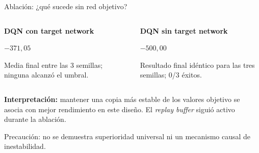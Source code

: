 \documentclass[aspectratio=169,10pt]{beamer}
\begin{document}
\begin{frame}{Ablación: ¿qué sucede sin red objetivo?}
\begin{columns}[T,onlytextwidth]
\begin{info}
\textbf{DQN con target network}\par\vspace{.13cm}
{\centering\color{Blue}\fontsize{27}{30}\selectfont\bfseries $-371,05$\par}
\vspace{.06cm}
\small Media final entre las 3 semillas; ninguna alcanzó el umbral.
\end{info}
\begin{info}
\textbf{DQN sin target network}\par\vspace{.13cm}
{\centering\color{Warn}\fontsize{27}{30}\selectfont\bfseries $-500,00$\par}
\vspace{.06cm}
\small Resultado final idéntico para las tres semillas; 0/3 éxitos.
\end{info}
\end{columns}
\vspace{.15cm}
\begin{takeaway}
\textbf{Interpretación:} mantener una copia más estable de los valores objetivo se asocia con mejor rendimiento en este diseño. El \emph{replay buffer} siguió activo durante la ablación.
\end{takeaway}
\vspace{.09cm}
{\footnotesize\color{Muted} Precaución: no se demuestra superioridad universal ni un mecanismo causal de inestabilidad.}
\end{frame}
\end{document}
